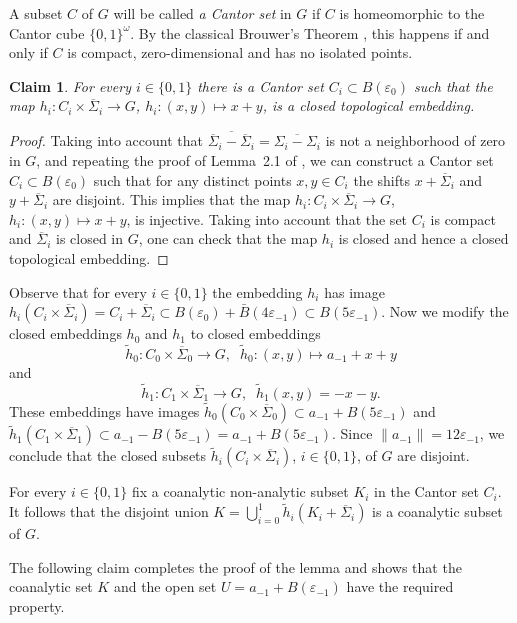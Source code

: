 \documentclass[11pt]{amsart}
\newtheorem{claim}{Claim}
\begin{document}
A subset $C$ of $G$ will be called {\em a Cantor set} in $G$ if $C$ is homeomorphic to the Cantor cube $\{0,1\}^{\omega}$. By the classical Brouwer's Theorem \cite[7.4]{Ke}, this happens if and only if $C$ is compact, zero-dimensional and has no isolated points.

\begin{claim}\label{cl2} For every $i\in\{0,1\}$ there is a Cantor set $C_i\subset B({\varepsilon}_{0})$ such that the map $h_i:C_i\times \overline\Sigma_i\to G$, $h_i:(x,y)\mapsto x+y$, is a closed topological embedding.
\end{claim}

\begin{proof} Taking into account that $\overline{\overline\Sigma_i-\overline\Sigma_i}=\overline{\Sigma_i-\Sigma_i}$ is not a neighborhood of zero in $G$, and repeating the proof of Lemma~2.1 of \cite{BLR}, we can construct a Cantor set $C_i\subset B({\varepsilon}_{0})$ such that for any distinct points $x,y\in C_i$ the shifts $x+\overline\Sigma_i$ and $y+\overline\Sigma_i$ are disjoint. This implies that the map $h_i:C_i\times\overline{\Sigma}_i\to G$, $h_i:(x,y)\mapsto x+y$, is injective. Taking into account that the set $C_i$ is compact and $\overline{\Sigma}_i$ is closed in $G$, one can check that the map $h_i$ is closed and hence a closed topological embedding.
\end{proof}

Observe that for every $i\in\{0,1\}$ the embedding $h_i$ has image $h_i(C_i\times\overline{\Sigma}_i)=C_i+\overline{\Sigma}_i\subset B({\varepsilon}_{0})+\bar B(4{\varepsilon}_{-1})\subset
B(5{\varepsilon}_{-1})$. Now we modify the closed embeddings $h_0$ and $h_1$ to closed embeddings
$$\tilde h_0:C_0\times\overline{\Sigma}_0\to G,\;\;\tilde h_0:(x,y)\mapsto a_{-1}+x+y$$and
$$\tilde h_1:C_1\times \overline{\Sigma}_1\to G,\;\;\tilde h_1(x,y)=-x-y.$$ These embeddings have images
$\tilde h_0(C_0\times\overline{\Sigma}_0)\subset a_{-1}+B(5{\varepsilon}_{-1})$ and $\tilde h_1(C_1\times\overline{\Sigma}_1)\subset a_{-1}-B(5{\varepsilon}_{-1})=a_{-1}+B(5{\varepsilon}_{-1})$.
Since $\|a_{-1}\|=12{\varepsilon}_{-1}$, we conclude that the closed subsets $\tilde h_i(C_i\times \overline{\Sigma}_i)$, $i\in\{0,1\}$, of $G$ are disjoint.

For every $i\in\{0,1\}$ fix a coanalytic non-analytic subset $K_i$ in the Cantor set $C_i$. It follows that the disjoint union $K=\bigcup_{i=0}^1 \tilde h_i(K_i+\overline{\Sigma}_i)$ is a coanalytic subset of $G$.

The following claim completes the proof of the lemma and shows that the coanalytic set $K$ and the open set  $U=a_{-1}+B({\varepsilon}_{-1})$ have the required property.
\end{document}
